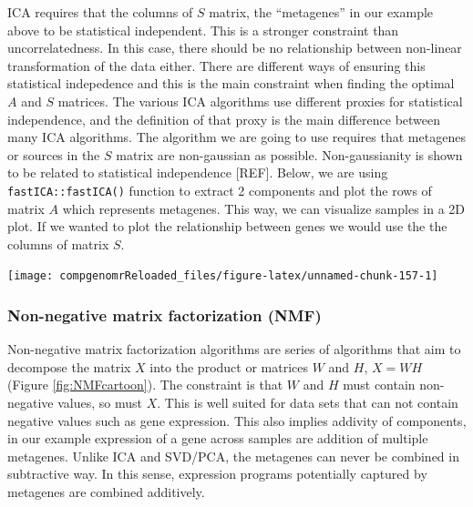\documentclass[12pt,]{krantz}
\newenvironment{Shaded}{\begin{snugshade}}{\end{snugshade}}
\newcommand{\CommentTok}[1]{\textcolor[rgb]{0.56,0.35,0.01}{\textit{#1}}}
\newcommand{\DataTypeTok}[1]{\textcolor[rgb]{0.13,0.29,0.53}{#1}}
\newcommand{\DecValTok}[1]{\textcolor[rgb]{0.00,0.00,0.81}{#1}}
\newcommand{\KeywordTok}[1]{\textcolor[rgb]{0.13,0.29,0.53}{\textbf{#1}}}
\newcommand{\NormalTok}[1]{#1}
\newcommand{\OperatorTok}[1]{\textcolor[rgb]{0.81,0.36,0.00}{\textbf{#1}}}
\theoremstyle{definition}
\theoremstyle{definition}
\theoremstyle{definition}
\theoremstyle{remark}
\begin{document}
ICA requires that the columns of \(S\) matrix, the ``metagenes'' in our
example above to be statistical independent. This is a stronger
constraint than uncorrelatedness. In this case, there should be no
relationship between non-linear transformation of the data either. There
are different ways of ensuring this statistical indepedence and this is
the main constraint when finding the optimal \(A\) and \(S\) matrices.
The various ICA algorithms use different proxies for statistical
independence, and the definition of that proxy is the main difference
between many ICA algorithms. The algorithm we are going to use requires
that metagenes or sources in the \(S\) matrix are non-gaussian as
possible. Non-gaussianity is shown to be related to statistical
independence {[}REF{]}. Below, we are using \texttt{fastICA::fastICA()}
function to extract 2 components and plot the rows of matrix \(A\) which
represents metagenes. This way, we can visualize samples in a 2D plot.
If we wanted to plot the relationship between genes we would use the the
columns of matrix \(S\).

\begin{Shaded}
\end{Shaded}

\begin{center}\texttt{[image: compgenomrReloaded\_files/figure-latex/unnamed-chunk-157-1]} \end{center}

\hypertarget{non-negative-matrix-factorization-nmf}{%
\subsubsection{Non-negative matrix factorization
(NMF)}\label{non-negative-matrix-factorization-nmf}}

Non-negative matrix factorization algorithms are series of algorithms
that aim to decompose the matrix \(X\) into the product or matrices
\(W\) and \(H\), \(X=WH\) (Figure \ref{fig:NMFcartoon}). The constraint
is that \(W\) and \(H\) must contain non-negative values, so must \(X\).
This is well suited for data sets that can not contain negative values
such as gene expression. This also implies addivity of components, in
our example expression of a gene across samples are addition of multiple
metagenes. Unlike ICA and SVD/PCA, the metagenes can never be combined
in subtractive way. In this sense, expression programs potentially
captured by metagenes are combined additively.
\end{document}
